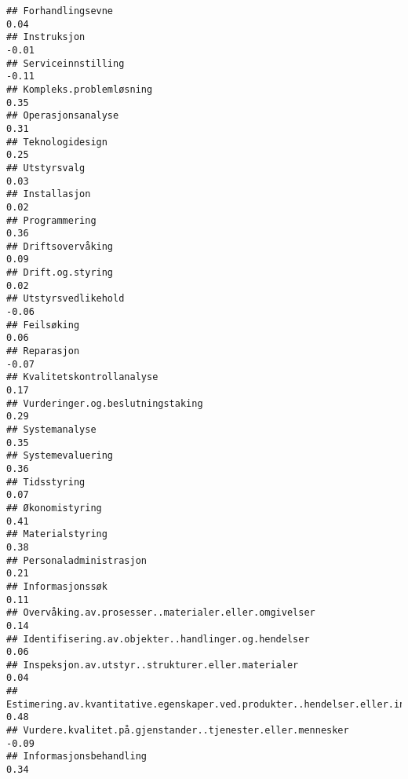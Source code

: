 \documentclass[
]{article}
\begin{document}
\begin{verbatim}
## Forhandlingsevne                                                                  0.04
## Instruksjon                                                                      -0.01
## Serviceinnstilling                                                               -0.11
## Kompleks.problemløsning                                                           0.35
## Operasjonsanalyse                                                                 0.31
## Teknologidesign                                                                   0.25
## Utstyrsvalg                                                                       0.03
## Installasjon                                                                      0.02
## Programmering                                                                     0.36
## Driftsovervåking                                                                  0.09
## Drift.og.styring                                                                  0.02
## Utstyrsvedlikehold                                                               -0.06
## Feilsøking                                                                        0.06
## Reparasjon                                                                       -0.07
## Kvalitetskontrollanalyse                                                          0.17
## Vurderinger.og.beslutningstaking                                                  0.29
## Systemanalyse                                                                     0.35
## Systemevaluering                                                                  0.36
## Tidsstyring                                                                       0.07
## Økonomistyring                                                                    0.41
## Materialstyring                                                                   0.38
## Personaladministrasjon                                                            0.21
## Informasjonssøk                                                                   0.11
## Overvåking.av.prosesser..materialer.eller.omgivelser                              0.14
## Identifisering.av.objekter..handlinger.og.hendelser                               0.06
## Inspeksjon.av.utstyr..strukturer.eller.materialer                                 0.04
## Estimering.av.kvantitative.egenskaper.ved.produkter..hendelser.eller.informasjon  0.48
## Vurdere.kvalitet.på.gjenstander..tjenester.eller.mennesker                       -0.09
## Informasjonsbehandling                                                            0.34

\end{verbatim}
\end{document}

